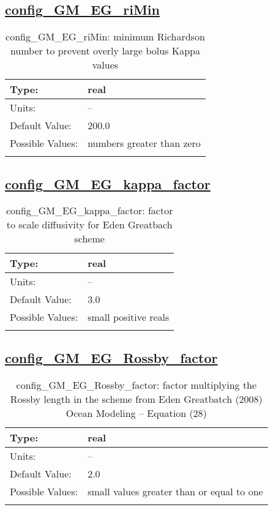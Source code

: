 \subsection[config\_GM\_EG\_riMin]{\hyperref[sec:nm_tab_GM_eddy_parameterization]{config\_GM\_EG\_riMin}}
\label{subsec:nm_sec_config_GM_EG_riMin}
\begin{center}
\begin{longtable}{| p{2.0in} || p{4.0in} |}
    \hline
    Type: & real \\
    \hline
    Units: & -- \\
    \hline
    Default Value: & 200.0 \\
    \hline
    Possible Values: & numbers greater than zero \\
    \hline
    \caption{config\_GM\_EG\_riMin: minimum Richardson number to prevent overly large bolus Kappa values}
\end{longtable}
\end{center}
\subsection[config\_GM\_EG\_kappa\_factor]{\hyperref[sec:nm_tab_GM_eddy_parameterization]{config\_GM\_EG\_kappa\_factor}}
\label{subsec:nm_sec_config_GM_EG_kappa_factor}
\begin{center}
\begin{longtable}{| p{2.0in} || p{4.0in} |}
    \hline
    Type: & real \\
    \hline
    Units: & -- \\
    \hline
    Default Value: & 3.0 \\
    \hline
    Possible Values: & small positive reals \\
    \hline
    \caption{config\_GM\_EG\_kappa\_factor: factor to scale diffusivity for Eden Greatbach scheme}
\end{longtable}
\end{center}
\subsection[config\_GM\_EG\_Rossby\_factor]{\hyperref[sec:nm_tab_GM_eddy_parameterization]{config\_GM\_EG\_Rossby\_factor}}
\label{subsec:nm_sec_config_GM_EG_Rossby_factor}
\begin{center}
\begin{longtable}{| p{2.0in} || p{4.0in} |}
    \hline
    Type: & real \\
    \hline
    Units: & -- \\
    \hline
    Default Value: & 2.0 \\
    \hline
    Possible Values: & small values greater than or equal to one \\
    \hline
    \caption{config\_GM\_EG\_Rossby\_factor: factor multiplying the Rossby length in the scheme from Eden Greatbatch (2008) Ocean Modeling -- Equation (28)}
\end{longtable}
\end{center}
